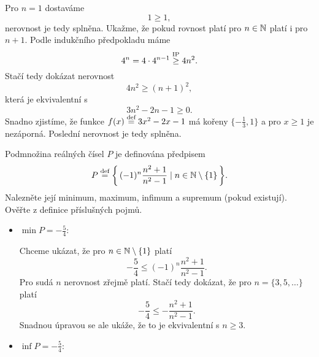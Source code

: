 \documentclass[answers]{exam}
\begin{document}
\begin{questions}
  \begin{solution}
    Pro $n = 1$ dostaváme
    \begin{equation*}
      1 \ge 1,
    \end{equation*}
    nerovnost je tedy splněna. Ukažme, že pokud rovnost platí pro $n \in \mathbb{N}$ platí i pro $n + 1$. Podle indukčního předpokladu máme
    \begin{equation*}
      4^n = 4 \cdot 4^{n - 1} \stackrel{\text{IP}}{\ge} 4n^2.
    \end{equation*}
    Stačí tedy dokázat nerovnost
    \begin{equation*}
      4 n^2
      \ge
      (n + 1)^2,
    \end{equation*}
    která je ekvivalentní s
    \begin{equation*}
      3n^2 - 2n - 1 \ge 0.
    \end{equation*}
    Snadno zjistíme, že funkce $f(x) \stackrel{\text{def}}{=} 3 x^2 - 2x - 1$ má kořeny $\{-\frac{1}{3}, 1\}$ a pro $x \ge 1$ je nezáporná.  Poslední nerovnost je tedy splněna.
   
  \end{solution}
  
  \question[2] Podmnožina reálných čísel $P$ je definována předpisem 
  \begin{equation*}
    P \defeq \set{(-1)^n \frac{n^2 + 1}{n^2 - 1}}{n \in \N \setminus \{1\}}.
  \end{equation*}
  Nalezněte její minimum, maximum, infimum a supremum (pokud existují). Ověřte z definice příslušných pojmů.
  
  \begin{solution}   
    \begin{itemize}
      \item $\min P = - \frac{5}{4}$: 
      
        Chceme ukázat, že pro $n \in \mathbb{N} \setminus \{1\}$ platí 
        \begin{equation*}
          - \frac{5}{4}
          \le
          (-1)^n \frac{n^2 + 1}{n^2 - 1}.
        \end{equation*}
        Pro sudá $n$ nerovnost zřejmě platí. Stačí tedy dokázat, že pro $n = \{3, 5, \dots\}$ platí
        \begin{equation*}
          - \frac{5}{4}
          \le
          -
          \frac{n^2 + 1}{n^2 - 1}.
        \end{equation*}
        Snadnou úpravou se ale ukáže, že to je ekvivalentní s $n \ge 3$.
      
      \item $\inf P = - \frac{5}{4}$:
      

\end{itemize}
\end{solution}
\end{questions}
\end{document}
